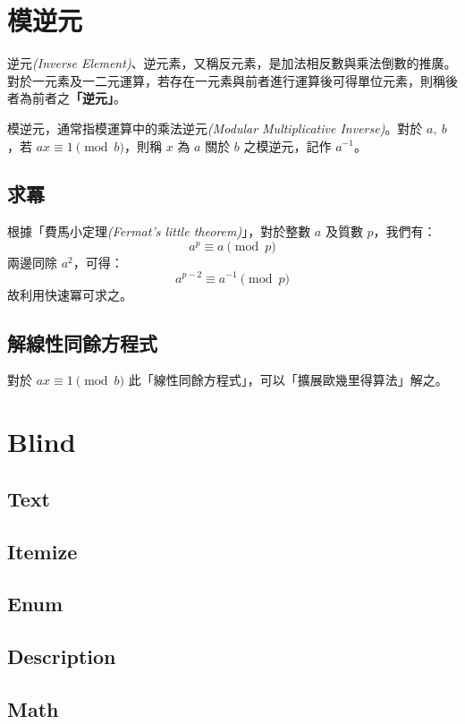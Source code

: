 \documentclass[12pt, a4paper]{article}
\begin{document}
\section{模逆元}

逆元\textit{(Inverse Element)}、逆元素，又稱反元素，是加法相反數與乘法倒數的推廣。對於一元素及一二元運算，若存在一元素與前者進行運算後可得單位元素，則稱後者為前者之\textbf{「逆元」}。

模逆元，通常指模運算中的乘法逆元\textit{(Modular Multiplicative Inverse)}。對於 $a,\ b$，若 $ax \equiv 1 \pmod b$，則稱 $x$ 為 $a$ 關於 $b$ 之模逆元，記作 $a^{-1}$。

\subsection{求冪}

根據「費馬小定理\textit{(Fermat's little theorem)}」，對於整數 $a$ 及質數 $p$，我們有：
\[a^p \equiv a \pmod p\]
兩邊同除 $a^2$，可得：
\[a^{p-2} \equiv a^{-1} \pmod p\]
故利用快速冪可求之。

\subsection{解線性同餘方程式}

對於 $ax \equiv 1 \pmod b$ 此「線性同餘方程式」，可以「擴展歐幾里得算法」解之。

\section{Blind}

\subsection{Text}

\blindtext

\subsection{Itemize}

\blinditemize[5]

\subsection{Enum}

\blindenumerate[5]

\subsection{Description}

\blinddescription[5]

\subsection{Math}

\blindmathpaper
\end{document}
